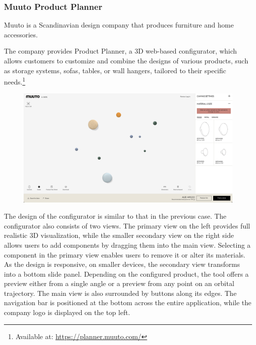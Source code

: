 \subsubsection{Muuto Product Planner}

Muuto is a Scandinavian design company that produces furniture and home accessories. \cite{Muuto}

The company provides Product Planner, a 3D web-based configurator, which allows customers to customize and combine the designs of various products, such as storage systems, sofas, tables, or wall hangers, tailored to their specific needs.\footnote{Available at: \url{https://planner.muuto.com/}}~\cite{MuutoPlanner}

\begin{figure}[h]
\centering
\includegraphics[width=\textwidth]{images/analysis_muuto-product-planner.png}
\end{figure}

The design of the configurator is similar to that in the previous case. The configurator also consists of two views. The primary view on the left provides full realistic 3D visualization, while the smaller secondary view on the right side allows users to add components by dragging them into the main view. Selecting a component in the primary view enables users to remove it or alter its materials. As the design is responsive, on smaller devices, the secondary view transforms into a bottom slide panel. Depending on the configured product, the tool offers a preview either from a single angle or a preview from any point on an orbital trajectory. The main view is also surrounded by buttons along its edges. The navigation bar is positioned at the bottom across the entire application, while the company logo is displayed on the top left.

